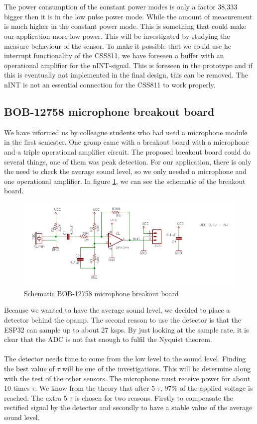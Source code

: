 \documentclass[11pt,a4paper]{article}
\begin{document}
\\ \\
The power consumption of the constant power modes is only a factor 38,333 bigger then it is in the low pulse power mode. While the amount of measurement is much higher in the constant power mode. This is something that could make our application more low power. This will be investigated by studying the measure behaviour of the sensor. To make it possible that we could use he interrupt functionality of the CSS811, we have foreseen a buffer with an operational amplifier for the nINT-signal.  This is foreseen in the prototype and if this is eventually not implemented in the final design, this can be removed. The nINT is not an essential connection for the CSS811 to work properly.


\subsection{BOB-12758 microphone breakout board}
We have informed us by colleague students who had used a microphone module in the first semester. One group came with a breakout board with a microphone and a triple operational amplifier circuit. The proposed breakout board could do several things, one of them was peak detection. For our application, there is only the need to check the average sound level, so we only needed a microphone and one operational amplifier. In figure \ref{fig:BOB-12758}, we can see the schematic of the breakout board.

\begin{figure}[H]
	\centering
	\includegraphics[width=0.8\linewidth]{schematic_microphone_break_out_board.png}
	\caption{Schematic BOB-12758 microphone breakout board}
	\label{fig:BOB-12758}
\end{figure}
Because we wanted to have the average sound level, we decided to place a detector behind the opamp. The second reason to use the detector is that the ESP32 can sample up to about 27 ksps. By just looking at the sample rate, it is clear that the ADC is not fast enough to fulfil the Nyquist theorem. 
\\ \\
The detector needs time to come from the low level to the sound level. Finding the best value of $\tau$ will be one of the investigations. This will be determine along with the test of the other sensors. The microphone must receive power for about 10 times $\tau$. We know from the theory that after 5 $\tau$, 97\% of the applied voltage is reached. The extra 5 $\tau$ is chosen for two reasons. Firstly to compensate the rectified signal by the detector and secondly to have a stable value of the average sound level.
\end{document}
